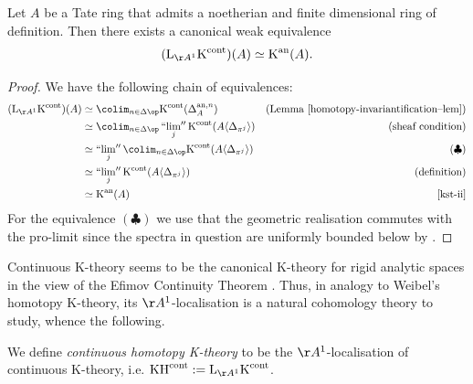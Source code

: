 \documentclass[colorinlistoftodos,article,11pt,reqno]{article}
\newcommand{\an}{\textup{an}}
\newcommand{\K}{\textup{K}}
\newcommand{\Kan}{\K^\textup{an}}
\newcommand{\Kcont}{\K^\textup{cont}}
\newcommand{\KHcont}{\textup{KH}^\textup{cont}}
\newcommand{\Arig}{\AA^{1}}
\newcommand{\skp}[1]{\langle #1 \rangle}
\DeclareMathOperator*{\prolim}{``lim''}
\renewcommand{\L}{\textup{L}}
\begin{document}
\begin{thm}[$\Arig$-localisation]
\label{A1-localisation--thm}
Let $A$ be a Tate ring that admits a noetherian and finite dimensional ring of definition. Then there exists a canonical weak equivalence
\[ (\L_{\Arig}\Kcont)(A) \simeq \Kan(A). \]
\end{thm}
\begin{proof}
We have the following chain of equivalences:
\begin{align*}
(\L_{\Arig}\Kcont)(A) 
&\simeq \colim_{n\in\Delta\op} \Kcont(\Delta_A^{\an,n})
&(\textup{Lemma}~\ref{homotopy-invariantification--lem})  \\
&\simeq \colim_{n\in\Delta\op} \prolim_j \Kcont(A\skp{\Delta_{\pi^j}})
&(\textup{sheaf condition}) \\
&\simeq \prolim_j \colim_{n\in\Delta\op} \Kcont(A\skp{\Delta_{\pi^j}})
& (\clubsuit) \\
&\simeq \prolim_j \Kcont(A\skp{\Delta_{\pi^j}})
& (\textup{definition}) \\
&\simeq \Kan(A) 
& \cite[\textup{Cor.}~2.9]{kst-ii}
\end{align*}
For the equivalence $(\clubsuit)$ we use that the geometric realisation commutes with the pro-limit \cite[\textup{Lem.}~2.8]{kst-ii} since the spectra in question are uniformly bounded below by \cite[Thm.~8.12]{dahli-thesis-paper}.
\end{proof}

Continuous K-theory seems to be the canonical K-theory for rigid analytic spaces in the view of the Efimov Continuity Theorem \cite[Satz~5.8]{andreychev-thesis}. Thus, in analogy to Weibel's homotopy K-theory, its $\Arig$-localisation is a natural cohomology theory to study, whence the following.

\begin{defi} \label{defi-continuous-homotopy-k-theory}
We define \emph{continuous homotopy K-theory} to be the $\Arig$-localisation of continuous K-theory, i.e. $\KHcont := \L_{\Arig}\Kcont$.
\end{defi}
\end{document}
